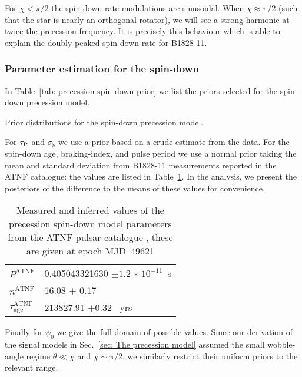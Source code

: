 \documentclass[../full_thesis/full_thesis.tex]{subfiles}
\newcommand{\thisdir}{../comparing_periodic_modulations}
\newcommand{\tauAge}{\tau_{\textrm{age}}}
\begin{document}
For $\chi < \pi/2$ the spin-down rate modulations are sinusoidal. When $\chi
\approx \pi/2$ (such that the star is nearly an orthogonal rotator), we will
see a strong harmonic at twice the precession frequency. It is precisely this
behaviour which is able to explain the doubly-peaked spin-down rate for
B1828-11.

\subsubsection{Parameter estimation for the spin-down}

In Table~\ref{tab: precession spin-down prior} we list the priors selected for
the spin-down precession model.
\begin{table}
\centering
\caption{Prior distributions for the spin-down precession model.}
\label{tab: precession spin-down prior}

\end{table}
For $\tau_{\mathrm{P}}$ and
$\sigma_{\dot{\nu}}$ we use a prior based on a crude estimate from the data.
For the spin-down age, braking-index, and pulse period we use a normal prior
taking the mean and standard deviation from B1828-11 measurements reported in the
ATNF catalogue: the values are listed in Table~\ref{tab: ATNF}. In the analysis,
we present the posteriors of the difference to the means of these values for
convenience.
\begin{table}
\centering
\caption{Measured and inferred values of the precession spin-down model parameters
from the ATNF pulsar catalogue \citep{ATNF}, these are given at epoch MJD~49621}
\label{tab: ATNF}
\begin{tabular}{ll} \hline
$P^{\mathrm{ATNF}}$ & 0.405043321630 $\pm 1.2\times10^{-11}$~s \\
$n^{\mathrm{ATNF}}$ & 16.08 $\pm$ 0.17 \\
$\tauAge^{\mathrm{ATNF}}$ & 213827.91 $\pm 0.32$~ yrs\\
\end{tabular}
\end{table}
Finally for $\psi_0$ we give the full domain of
possible values. Since our derivation of the signal models in Sec.~\ref{sec:
The precession model} assumed the small wobble-angle regime $\theta \ll \chi$
and $\chi \sim \pi/2$, we similarly restrict their uniform priors to the
relevant range.
\end{document}
